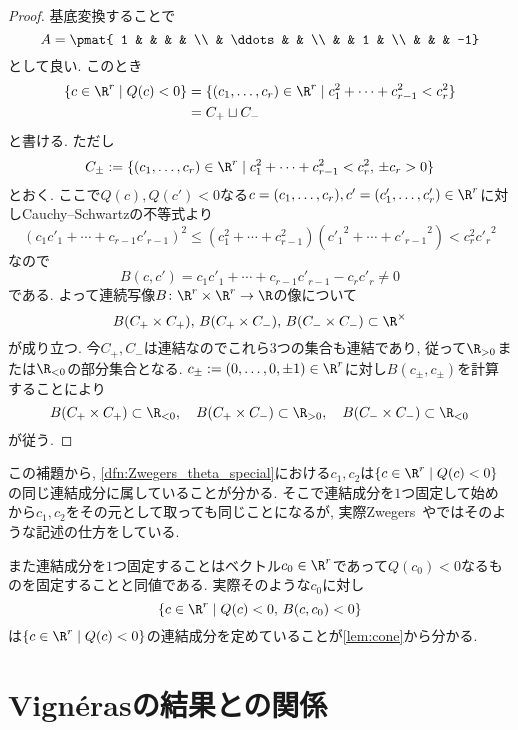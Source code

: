 \documentclass[11pt,b5paper,oneside,lualatex]{ltjsarticle} %
\numberwithin{equation}{section} %
\begin{document}
\begin{proof}
	基底変換することで
	\[
	A = \pmat{ 1 & & & & \\ & \ddots & & \\ & & 1 & \\ & & & -1}
	\]
	として良い. このとき
	\begin{align}
		\{ c \in \R^r \mid Q(c) < 0 \}
		&= \{ (c_1, \dots, c_r) \in \R^r \mid c_1^2 + \cdots + c_{r-1}^2 < c_r^2 \}
		\\
		&= C_+ \sqcup C_-
	\end{align}
	と書ける. 
	ただし
	\[
	C_\pm :=  \{ (c_1, \dots, c_r) \in \R^r \mid c_1^2 + \cdots + c_{r-1}^2 < c_r^2, \, \pm c_r > 0 \}
	\]
	とおく. 
	ここで$ Q(c), Q(c') < 0 $なる$ c = (c_1, \dots, c_r), c' = (c'_1, \dots, c'_r) \in \R^r $に対しCauchy--Schwartzの不等式より
	\[
	(c_1 c'_1 + \cdots + c_{r-1} c'_{r-1})^2
	\le
	(c_1^2 + \cdots + c_{r-1}^2) ({c'_1}^2 + \cdots + {c'_{r-1}}^2)
	<
	c_r^2 {c'_r}^2
	\]
	なので
	\[
	B(c, c') = c_1 c'_1 + \cdots + c_{r-1} c'_{r-1} - c_r c'_r \neq 0
	\]
	である. 
	よって連続写像$ B \colon \R^r \times \R^r \to \R $の像について
	\[
	B(C_+ \times C_+), \,
	B(C_+ \times C_-), \,
	B(C_- \times C_-) \subset \R^\times
	\]
	が成り立つ. 
	今$ C_+, C_- $は連結なのでこれら$ 3 $つの集合も連結であり, 従って$ \R_{>0} $または$ \R_{<0} $の部分集合となる. 
	$ c_\pm := (0, \dots, 0, \pm 1) \in \R^r $に対し$ B(c_\pm, c_\pm) $を計算することにより
	\[
	B(C_+ \times C_+) \subset \R_{<0}, \quad
	B(C_+ \times C_-) \subset \R_{>0}, \quad
	B(C_- \times C_-) \subset \R_{<0}
	\]
	が従う. 
\end{proof}

この補題から, \cref{dfn:Zwegers_theta_special}における$ c_1, c_2 $は$ \{ c \in \R^r \mid Q(c) < 0 \} $の同じ連結成分に属していることが分かる. 
そこで連結成分を$ 1 $つ固定して始めから$ c_1, c_2 $をその元として取っても同じことになるが, 実際Zwegers~\cite{Zwegers_thesis}や\cite{BFOR}ではそのような記述の仕方をしている. 

また連結成分を$ 1 $つ固定することはベクトル$ c_0 \in \R^r $であって$ Q(c_0) < 0 $なるものを固定することと同値である.
実際そのような$ c_0 $に対し
\[
\{ c \in \R^r \mid Q(c) < 0, \, B(c, c_0) < 0 \}
\]
は$ \{ c \in \R^r \mid Q(c) < 0 \} $の連結成分を定めていることが\cref{lem:cone}から分かる. 


\section{Vign\'{e}rasの結果との関係} \label{sec:Vigneras}
\end{document}
